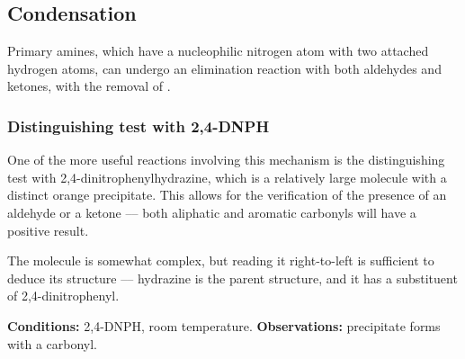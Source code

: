 

		\subsection{Condensation}

			Primary amines, which have a nucleophilic nitrogen atom with two attached hydrogen atoms, can undergo an elimination
			reaction with both aldehydes and ketones, with the removal of .


			\subsubsection{Distinguishing test with 2,4-DNPH}

				One of the more useful reactions involving this mechanism is the distinguishing test with 2,4-dinitrophenylhydrazine, which
				is a relatively large molecule with a distinct orange precipitate. This allows for the verification of the presence of
				an aldehyde or a ketone –– both aliphatic and aromatic carbonyls will have a positive result.

				The molecule is somewhat complex, but reading it right-to-left is sufficient to deduce its structure –– hydrazine is the parent
				structure, and it has a substituent of 2,4-dinitrophenyl.

				\vspace{1.5em}
				\vbox{\textbf{Conditions:}	\tabto{35mm}2,4-DNPH, room temperature.}	%
				\vbox{\textbf{Observations:} precipitate forms with a carbonyl.}

